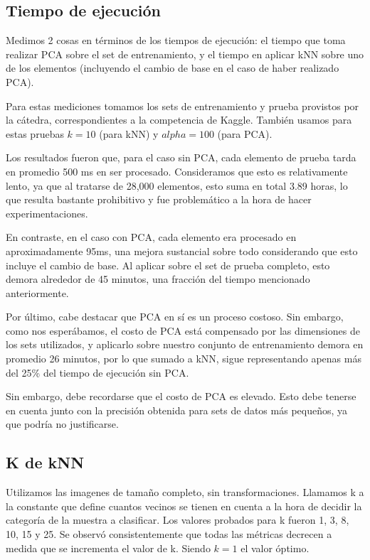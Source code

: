 \subsection{Tiempo de ejecución}

Medimos 2 cosas en términos de los tiempos de ejecución: el tiempo que toma realizar PCA sobre el set de entrenamiento, y el tiempo en aplicar kNN sobre uno de los elementos (incluyendo el cambio de base en el caso de haber realizado PCA).

Para estas mediciones tomamos los sets de entrenamiento y prueba provistos por la cátedra, correspondientes a la competencia de Kaggle. También usamos para estas pruebas $k = 10$ (para kNN) y $alpha = 100$ (para PCA). 

Los resultados fueron que, para el caso sin PCA, cada elemento de prueba tarda en promedio 500 ms en ser procesado. Consideramos que esto es relativamente lento, ya que al tratarse de 28,000 elementos, esto suma en total 3.89 horas, lo que resulta bastante prohibitivo y fue problemático a la hora de hacer experimentaciones.

En contraste, en el caso con PCA, cada elemento era procesado en aproximadamente 95ms, una mejora sustancial sobre todo considerando que esto incluye el cambio de base. Al aplicar sobre el set de prueba completo, esto demora alrededor de 45 minutos, una fracción del tiempo mencionado anteriormente.

Por último, cabe destacar que PCA en sí es un proceso costoso. Sin embargo, como nos esperábamos, el costo de PCA está compensado por las dimensiones de los sets utilizados, y aplicarlo sobre nuestro conjunto de entrenamiento demora en promedio 26 minutos, por lo que sumado a kNN, sigue representando apenas más del 25\% del tiempo de ejecución sin PCA.

Sin embargo, debe recordarse que el costo de PCA es elevado. Esto debe tenerse en cuenta junto con la precisión obtenida para sets de datos más pequeños, ya que podría no justificarse.

\subsection{K de kNN}

Utilizamos las imagenes de tamaño completo, sin transformaciones. Llamamos k a la constante que define cuantos vecinos se tienen en cuenta a la hora de decidir la categoría de la muestra a clasificar. Los valores probados para k fueron 1, 3, 8, 10, 15 y 25. Se observó consistentemente que todas las métricas decrecen a medida que se incrementa el valor de k. Siendo $k = 1$ el valor óptimo. 

